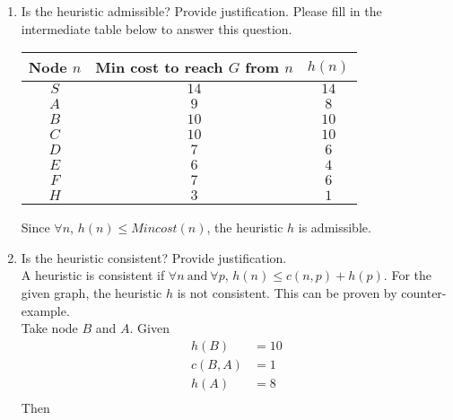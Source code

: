 \begin{enumerate}
  \item Is the heuristic admissible? Provide justification. Please fill in the intermediate table below to answer this question.
        \begin{center}
          \bgroup
          \def\arraystretch{1.5}%
          \captionsetup{type=figure}
          \begin{tabular}{|c|c|c|}
            \hline
            Node $n$ & Min cost to reach $G$ from $n$ & $h(n)$ \\
            \hline
            $S$      & $14$                           & $14$   \\
            $A$      & $9$                            & $8$    \\
            $B$      & $10$                           & $10$   \\
            $C$      & $10$                           & $10$   \\
            $D$      & $7$                            & $6$    \\
            $E$      & $6$                            & $4$    \\
            $F$      & $7$                            & $6$    \\
            $H$      & $3$                            & $1$    \\
            \hline
          \end{tabular}
          \egroup
        \end{center}
        Since $\forall n$, $h(n)\le Mincost(n)$, the heuristic $h$ is admissible.
  \item Is the heuristic consistent? Provide justification.\\[10pt]
        A heuristic is consistent if $\forall n \ \text{and}\  \forall p$, $h(n) \le c(n,p) + h(p)$. For the given graph, the heuristic $h$ is not consistent. This can be proven by counter-example.\\
        Take node $B$ and $A$. Given
        \begin{align*}
          h(B)   & = 10 \\
          c(B,A) & = 1  \\
          h(A)   & = 8  \\
        \end{align*}
        Then
        \begin{align*}

\end{align*}
\end{enumerate}
